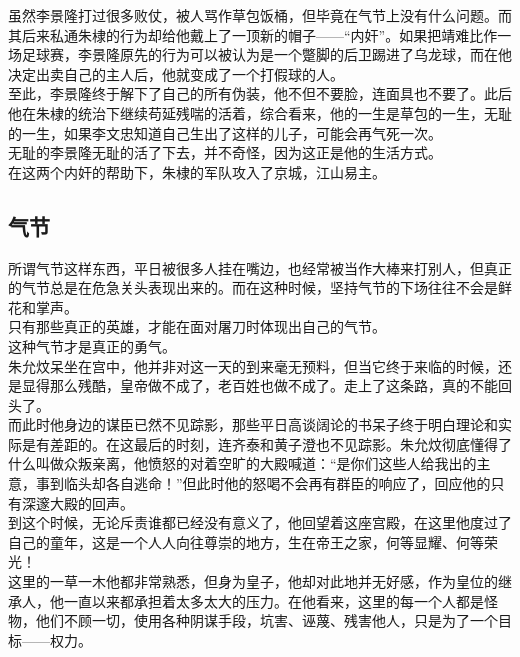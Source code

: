 \begin{multicols}{\theparacolNo}
虽然李景隆打过很多败仗，被人骂作草包饭桶，但毕竟在气节上没有什么问题。而其后来私通朱棣的行为却给他戴上了一顶新的帽子——“内奸”。如果把靖难比作一场足球赛，李景隆原先的行为可以被认为是一个蹩脚的后卫踢进了乌龙球，而在他决定出卖自己的主人后，他就变成了一个打假球的人。\\

至此，李景隆终于解下了自己的所有伪装，他不但不要脸，连面具也不要了。此后他在朱棣的统治下继续苟延残喘的活着，综合看来，他的一生是草包的一生，无耻的一生，如果李文忠知道自己生出了这样的儿子，可能会再气死一次。\\

无耻的李景隆无耻的活了下去，并不奇怪，因为这正是他的生活方式。\\

在这两个内奸的帮助下，朱棣的军队攻入了京城，江山易主。\\

\subsection{气节}
所谓气节这样东西，平日被很多人挂在嘴边，也经常被当作大棒来打别人，但真正的气节总是在危急关头表现出来的。而在这种时候，坚持气节的下场往往不会是鲜花和掌声。\\

只有那些真正的英雄，才能在面对屠刀时体现出自己的气节。\\

这种气节才是真正的勇气。\\

朱允炆呆坐在宫中，他并非对这一天的到来毫无预料，但当它终于来临的时候，还是显得那么残酷，皇帝做不成了，老百姓也做不成了。走上了这条路，真的不能回头了。\\

而此时他身边的谋臣已然不见踪影，那些平日高谈阔论的书呆子终于明白理论和实际是有差距的。在这最后的时刻，连齐泰和黄子澄也不见踪影。朱允炆彻底懂得了什么叫做众叛亲离，他愤怒的对着空旷的大殿喊道：“是你们这些人给我出的主意，事到临头却各自逃命！”但此时他的怒喝不会再有群臣的响应了，回应他的只有深邃大殿的回声。\\

到这个时候，无论斥责谁都已经没有意义了，他回望着这座宫殿，在这里他度过了自己的童年，这是一个人人向往尊崇的地方，生在帝王之家，何等显耀、何等荣光！\\

这里的一草一木他都非常熟悉，但身为皇子，他却对此地并无好感，作为皇位的继承人，他一直以来都承担着太多太大的压力。在他看来，这里的每一个人都是怪物，他们不顾一切，使用各种阴谋手段，坑害、诬蔑、残害他人，只是为了一个目标——权力。\\


\end{multicols}
